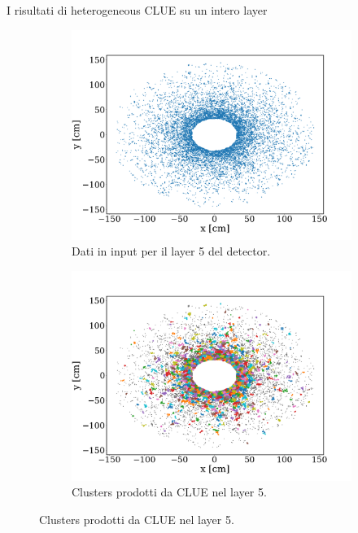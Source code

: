 \documentclass{beamer}
\begin{document}
\begin{frame}{I risultati di heterogeneous CLUE su un intero layer}
\begin{figure}
    \centering
    \begin{subfigure}[t]{0.49\linewidth}
\includegraphics[width=\linewidth]{media/presentazione/whole_detector.png}
    \caption{Dati in input per il layer 5 del detector.}
    \end{subfigure}
    \hfill
    \begin{subfigure}[t]{0.49\linewidth}
        \includegraphics[width=\linewidth]{media/presentazione/clusters_whole_detector.png}
        \caption{Clusters prodotti da CLUE nel layer 5.}
    \end{subfigure}
\end{figure}

\end{frame}
\end{document}
